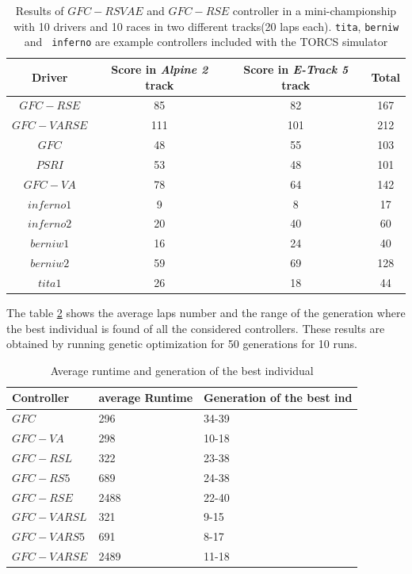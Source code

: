\documentclass[10pt,journal,compsoc]{IEEEtran}
\begin{document}
\begin{table}[ht]
	\centering
	{\scriptsize
		\caption{ Results of $GFC-RSVAE$ and $GFC-RSE$ controller in a mini-championship with 10 drivers and 10
			races in two different tracks(20 laps each). {\tt tita}, {\tt berniw} and {\tt
				inferno} are example controllers included with the TORCS
			simulator \cite{torcs4}}
		{
			\begin{tabular}{|c|c|c||c|}
				\hline
				Driver&Score in \textit{Alpine 2} track &Score in \textit{E-Track 5} track &Total\\
				\hline
				\hline
$GFC-RSE$&	85&	82&	167\\
$GFC-VARSE$&111&101&212\\
$GFC$&		48&	55&	103\\
$PSRI$&		53&	48&	101\\
$GFC-VA$&	78&	64&	142\\
$inferno1$&	9&	8&	17\\
$inferno2$&	20&	40&	60\\
$berniw1$&	16&	24&	40\\
$berniw2$&	59&	69&	128\\
$tita1$&	26&	18&	44\\
					\hline
				
			\end{tabular}
		}\label{tab:allsresults}
	}
\end{table}
%




The table \ref{tab:time} shows the average laps number and the range of the generation where the best individual is found of all the considered controllers. These results are obtained by running genetic optimization for 50 generations for 10 runs. 

\begin{table}[!ht]
	\centering
	{\scriptsize
		\caption{Average runtime and generation of the best individual}
		\label{tab:time}
		\begin{tabular}{|p{2.85cm}|p{1.65cm}|p{1.65cm}|}
			\hline 	
			\hline  
			Controller& \textbf{average Runtime}&\textbf{Generation of the best ind}\\					
			\hline \textbf{\textbf{$GFC$}}&296 &34-39\\
			\hline \textbf{$GFC-VA$}&298	&10-18\\	
			\hline \textbf{$GFC-RSL$}& 322&23-38\\	
			\hline \textbf{$GFC-RS5$}&689	&24-38\\	
			\hline \textbf{$GFC-RSE$}&	2488&22-40\\	
			\hline \textbf{$GFC-VARSL$}&321	&9-15\\	
			\hline\textbf{$GFC-VARS5$}&	691&8-17\\	
			\hline\textbf{$GFC-VARSE$}&2489	&11-18\\					
			\hline 
		\end{tabular}
		
	}
\end{table} 
\end{document}
